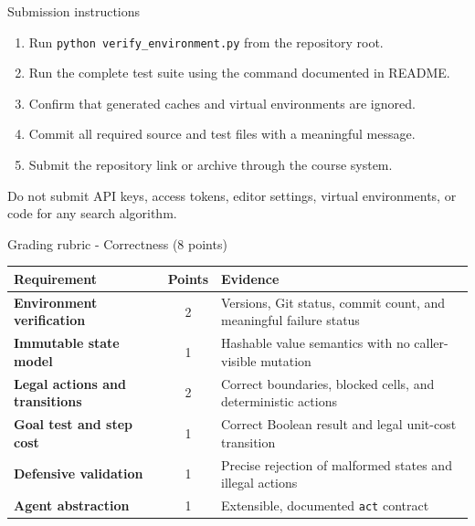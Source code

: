 \documentclass[aspectratio=169,11pt]{beamer}
\begin{document}
\begin{frame}{Submission instructions}
  \begin{enumerate}
    \item Run \texttt{python verify\_environment.py} from the repository root.
    \item Run the complete test suite using the command documented in README.
    \item Confirm that generated caches and virtual environments are ignored.
    \item Commit all required source and test files with a meaningful message.
    \item Submit the repository link or archive through the course system.
  \end{enumerate}

  \vspace{0.3cm}
  \begin{alertblock}{Do not submit}
    API keys, access tokens, editor settings, virtual environments, or code for
    any search algorithm.
  \end{alertblock}
\end{frame}

\begin{frame}{Grading rubric - Correctness (8 points)}
  \scriptsize
  \begin{tabularx}{\textwidth}{>{\bfseries}p{} c X}
    \toprule
    Requirement & Points & Evidence \\
    \midrule
    Environment verification & 2 & Versions, Git status, commit count, and
      meaningful failure status \\
    Immutable state model & 1 & Hashable value semantics with no caller-visible mutation \\
    Legal actions and transitions & 2 & Correct boundaries, blocked cells, and
      deterministic actions \\
    Goal test and step cost & 1 & Correct Boolean result and legal unit-cost transition \\
    Defensive validation & 1 & Precise rejection of malformed states and illegal actions \\
    Agent abstraction & 1 & Extensible, documented \texttt{act} contract \\
    \bottomrule
  \end{tabularx}
\end{frame}
\end{document}
